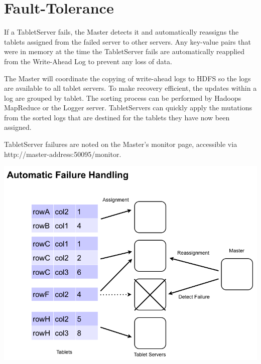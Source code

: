 \section{Fault-Tolerance}

If a TabletServer fails, the Master detects it and automatically reassigns the tablets
assigned from the failed server to other servers. Any key-value pairs that were in
memory at the time the TabletServer fails are automatically reapplied from the Write-Ahead
Log to prevent any loss of data.

The Master will coordinate the copying of write-ahead logs to HDFS so the logs
are available to all tablet servers. To make recovery efficient, the updates
within a log are grouped by tablet.  The sorting process can be performed by
Hadoops MapReduce or the Logger server. TabletServers can quickly apply the
mutations from the sorted logs that are destined for the tablets they have now
been assigned.

TabletServer failures are noted on the Master's monitor page, accessible via\\
\mbox{http://master-address:50095/monitor}.

\begin{center}
\includegraphics[scale=0.4]{images/failure_handling.png}
\end{center}

